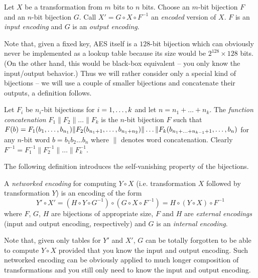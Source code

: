 \begin{defn}[Encoding]
	Let $X$ be a transformation from $m$ bits to $n$ bits. Choose an $m$-bit bijection $F$ and an $n$-bit bijection $G$. Call $X' = G \circ X \circ F^{-1}$ an {\em encoded} version of $X$. $F$ is an {\em input encoding} and $G$ is an {\em output encoding}.
\end{defn}

Note that, given a fixed key, AES itself is a $128$-bit bijection which can obviously never be implemented as a lookup table because its size would be $2^{128}\times 128$ bits. (On the other hand, this would be black-box equivalent -- you only know the input/output behavior.) Thus we will rather consider only a special kind of bijections -- we will use a couple of smaller bijections and concatenate their outputs, a definition follows.

\begin{defn}
\label{def:concat}
	Let $F_i$ be $n_i$-bit bijections for $i=1 , \ldots , k$ and let $n = n_1 + \ldots + n_k$. The {\em function concatenation} $F_1 \| F_2 \| \ldots \| F_k$ is the $n$-bit bijection $F$ such that $F(b) = F_1(b_1 , \ldots , b_{n_1})\| F_2(b_{n_1+1} , \ldots , b_{n_1+n_2})\|\ldots\| F_k(b_{n_1+\ldots+n_{k-1}+1} , \ldots , b_n)$ for any $n$-bit word $b=b_1b_2\ldots b_n$ where $\|$ denotes word concatenation. Clearly $F^{-1} = F_1^{-1}\| F_2^{-1}\| \ldots \|F_k^{-1}$.
\end{defn}

The following definition introduces the self-vanishing property of the bijections.

\begin{defn}
\label{def:netw}
	A {\em networked encoding} for computing $Y\circ X$ (i.e. transformation $X$ followed by transformation $Y$) is an encoding of the form
	\[
		Y'\circ X' = (H\circ Y\circ G^{-1})\circ(G\circ X\circ F^{-1}) = H\circ(Y\circ X)\circ F^{-1}
	\]
	where $F$, $G$, $H$ are bijections of appropriate size, $F$ and $H$ are {\em external encodings} (input and output encoding, respectively) and $G$ is an {\em internal encoding}.
\end{defn}

Note that, given only tables for $Y'$ and $X'$, $G$ can be totally forgotten to be able to compute $Y\circ X$ provided that you know the input and output encoding. Such networked encoding can be obviously applied to much longer composition of transformations and you still only need to know the input and output encoding.   %


